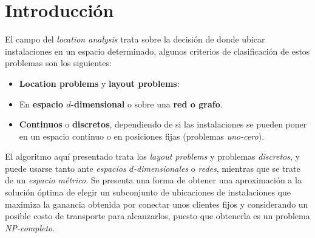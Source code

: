 \section{Introducción}

El campo del \emph{location analysis} trata sobre la decisión de donde ubicar instalaciones en un espacio determinado, algunos criterios de clasificación de estos problemas son los siguientes\cite{revelle2005location}:

\begin{itemize}
\item \textbf{Location problems} y \textbf{layout problems}:
\item En \textbf{espacio $d$-dimensional} o sobre una \textbf{red o grafo}.
\item \textbf{Continuos} o \textbf{discretos}, dependiendo de si las instalaciones se pueden poner en un espacio continuo o en posiciones fijas (problemas \emph{uno-cero}).
\end{itemize}

El algoritmo aquí presentado trata los \emph{layout problems} y problemas \emph{discretos}, y puede usarse tanto ante \emph{espacios $d$-dimensionales} o \emph{redes}, mientras que se trate de un \emph{espacio métrico}. Se presenta una forma de obtener una aproximación a la solución óptima de elegir un subconjunto de ubicaciones de instalaciones que maximiza la ganancia obtenida por conectar unos clientes fijos y considerando un posible costo de transporte para alcanzarlos, puesto que obtenerla es un problema \emph{NP-completo}.

